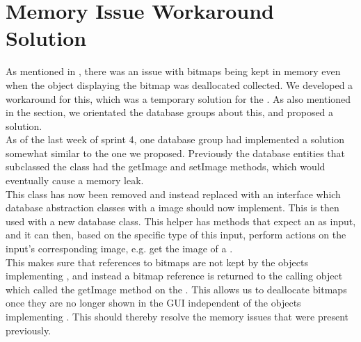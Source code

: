 
\section{Memory Issue Workaround Solution}
\label{sec:memory_issue_workaround_solution}

As mentioned in , there was an issue with bitmaps being kept in memory even when the object displaying the bitmap was deallocated collected. We developed a workaround for this, which was a temporary solution for the . As also mentioned in the section, we orientated the database groups about this, and proposed a solution. \\

As of the last week of sprint 4, one database group had implemented a solution somewhat similar to the one we proposed. Previously the database entities that subclassed the  class had the getImage and setImage methods, which would eventually cause a memory leak. \\

This class has now been removed and instead replaced with an  interface which database abstraction classes with a image should now implement. This  is then used with a new  database class. This helper has methods that expect an  as input, and it can then, based on the specific type of this input, perform actions on the input's corresponding image, e.g. get the image of a . \\

This makes sure that references to bitmaps are not kept by the objects implementing , and instead a bitmap reference is returned to the calling object which called the getImage method on the . This allows us to deallocate bitmaps once they are no longer shown in the GUI independent of the objects implementing . This should thereby resolve the memory issues that were present previously. 